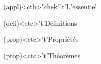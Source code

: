 \documentclass[../../main/main.tex]{subfiles}
\begin{document}
\begin{tcn}[%
		sidebyside, fontupper=\small, fontlower=\small
	](appl)<ctb>"chek"'t'{L'essentiel}
	\begin{tcn}[nsp](defi)<ctc>'t'{Définitions}
		\vspace{-25pt}
	\end{tcn}
	\begin{tcn}[nsp](prop)<ctc>'t'{Propriétés}
		\vspace{-25pt}
	\end{tcn}
	\begin{tcn}[nsp](prop)<ctc>'t'{Théorèmes}
		\vspace{-25pt}

\end{tcn}
\end{tcn}
\end{document}
